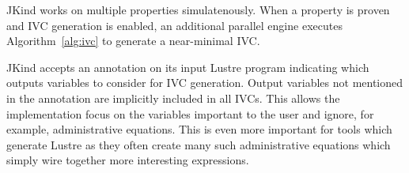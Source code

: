 JKind works on multiple properties simulatenously. When a property is
proven and IVC generation is enabled, an additional parallel engine
executes Algorithm~\ref{alg:ivc} to generate a near-minimal IVC.

JKind accepts an annotation on its input Lustre program indicating
which outputs variables to consider for IVC generation. Output
variables not mentioned in the annotation are implicitly included in
all IVCs. This allows the implementation focus on the variables
important to the user and ignore, for example, administrative
equations. This is even more important for tools which generate Lustre
as they often create many such administrative equations which simply
wire together more interesting expressions.
